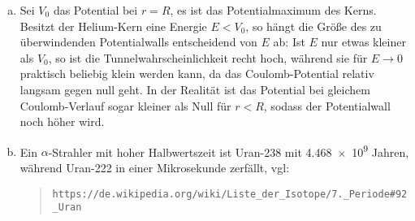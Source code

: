 \begin{enumerate}[(a)]
\item Sei $V_0$ das Potential bei $r=R$, es ist das Potentialmaximum des Kerns. Besitzt der Helium-Kern eine Energie $E<V_0$, so hängt die Größe des zu überwindenden Potentialwalls entscheidend von $E$ ab: Ist $E$ nur etwas kleiner als $V_0$, so ist die Tunnelwahrscheinlichkeit recht hoch, während sie für $E\to 0$ praktisch beliebig klein werden kann, da das Coulomb-Potential relativ langsam gegen null geht. In der Realität ist das Potential bei gleichem Coulomb-Verlauf sogar kleiner als Null für $r<R$, sodass der Potentialwall noch höher wird.

\item Ein $\alpha$-Strahler mit hoher Halbwertszeit ist Uran-238 mit \num{4.468e9} Jahren, während Uran-222 in einer Mikrosekunde zerfällt, vgl: 
\begin{quotation}
\texttt{https://de.wikipedia.org/wiki/Liste\_der\_Isotope/7.\_Periode\#92\_Uran}
\end{quotation}

\end{enumerate}